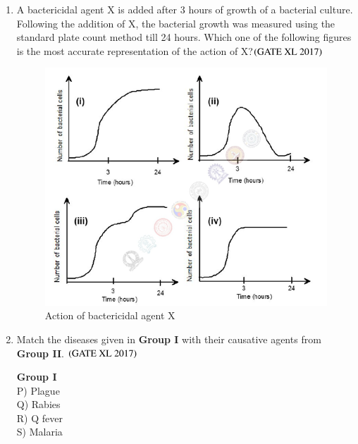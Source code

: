 \documentclass[journal]{IEEEtran}
\begin{document}
\begin{enumerate}
\item A bactericidal agent X is added after 3 hours of growth of a bacterial culture. Following the addition of X, the bacterial growth was measured using the standard plate count method till 24 hours. Which one of the following figures is the most accurate representation of the action of X?\hfill $\left(\text{GATE XL 2017}\right)$

\begin{figure}[H]
    \centering
    \includegraphics[width=0.8\columnwidth]{figs/fig_q67.png}
    \caption{Action of bactericidal agent X}
    \label{fig:q67}
\end{figure}

\begin{enumerate}
\end{enumerate}


\item Match the diseases given in \textbf{Group I} with their causative agents from \textbf{Group II}.  \hfill $\left(\text{GATE XL 2017}\right)$

\begin{multicols}{2}
\noindent \textbf{Group I} \\
P) Plague \\
Q) Rabies \\
R) Q fever \\
S) Malaria \\


\end{multicols}
\end{enumerate}
\end{document}
